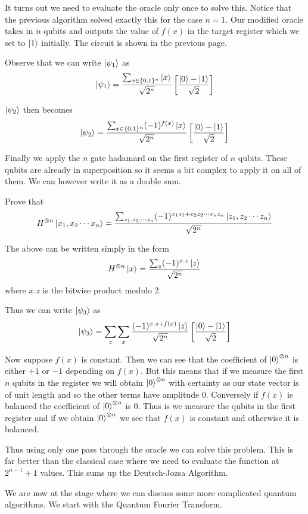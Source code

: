It turns out we need to evaluate the oracle only once to solve this. Notice that the previous algorithm solved exactly this for the case $n=1$. Our modified oracle takes in $n$ qubits and outputs the value of $f(x)$ in the target register which we set to $\ket{1}$ initially. The circuit is shown in the previous page.

Observe that we can write $\ket{\psi_1}$ as 
$$\ket{\psi_1} = \frac{\sum_{x \in \{0, 1\}^n} \ket{x} }{\sqrt{2^n}} \left[ \frac{\ket{0} - \ket{1}}{\sqrt{2}} \right]$$

$\ket{\psi_2}$ then becomes 
$$\ket{\psi_2} = \frac{\sum_{x \in \{0, 1\}^n} (-1)^{f(x)}\ket{x} }{\sqrt{2^n}} \left[ \frac{\ket{0} - \ket{1}}{\sqrt{2}} \right]$$

Finally we apply the $n$ gate hadamard on the first register of $n$ qubits. These qubits are already in superposition so it seems a bit complex to apply it on all of them. We can however write it as a double sum.

\begin{exercise}
Prove that $$H^{\otimes n} \ket{x_1, x_2 \cdots x_n} = \frac{\sum_{z_1, z_{2}, \cdots z_n}(-1)^{x_{1}z_{1} + x_{2}z_{2} \cdots x_{n}z_{n}}\ket{z_1, z_2 \cdots z_n}}{\sqrt{2^n}}$$
\end{exercise}

The above can be written simply in the form 
 $$H^{\otimes n} \ket{x} = \frac{\sum_{z}(-1)^{x.z}\ket{z}}{\sqrt{2^n}}$$ 
where $x.z$ is the bitwise product modulo 2.

Thus we can write $\ket{\psi_3}$ as
$$\ket{\psi_3} = \sum_z \sum_x \frac{(-1)^{x.z + f(x)}\ket{z}}{\sqrt{2^n}}\left[\frac{\ket{0} - \ket{1}}{\sqrt{2}} \right]$$

Now suppose $f(x)$ is constant. Then we can see that the coefficient of $\ket{0}^{\otimes n}$ is either $+1$ or $-1$ depending on $f(x)$. But this means that if we measure the first $n$ qubits in the register we will obtain $\ket{0}^{\otimes n}$ with certainty as our state vector is of unit length and so the other terms have amplitude $0$. Conversely if $f(x)$ is balanced the coefficient of  $\ket{0}^{\otimes n}$ is $0$. Thus is we measure the qubits in the first register and if we obtain $\ket{0}^{\otimes n}$  we see that $f(x)$ is constant and otherwise it is balanced.

Thus using only one pass through the oracle we can solve this problem. This is far better than the classical case where we need to evaluate the function at $2^{n-1} + 1$ values. This sums up the Deutsch-Jozsa Algorithm.

We are now at the stage where we can discuss some more complicated quantum algorithms. We start with the Quantum Fourier Transform.

\clearpage